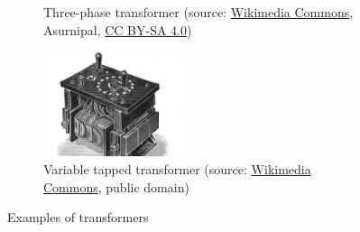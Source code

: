 \begin{frame}
\begin{figure}
\begin{subfigure}[b]{0.49\textwidth}
			\caption{Three-phase transformer (source: \href{https://commons.wikimedia.org/wiki/File:Dornbirn-Umspannwerk_Werben-110kV_FS6-Anlage_Trafo_Elin_220-110kV-01ASD.jpg}{Wikimedia Commons}, Asurnipal, \href{https://creativecommons.org/licenses/by-sa/4.0/deed.en}{CC BY-SA 4.0})}
		\end{subfigure}
		\hfill
		\begin{subfigure}[b]{0.49\textwidth}
			\centering
			\includegraphics[width=0.45\textwidth]{fig/lec04/Tapped_transformer.jpg}
			\caption{Variable tapped transformer (source: \href{https://commons.wikimedia.org/wiki/File:Variable-tap_regulating_transformer_(Rankin_Kennedy,_Electrical_Installations,_Vol_II,_1909).jpg}{Wikimedia Commons}, public domain)}
		\end{subfigure}
		\caption*{Examples of transformers} 
        \label{fig:examples_transformers}
	\end{figure}
\end{frame}

